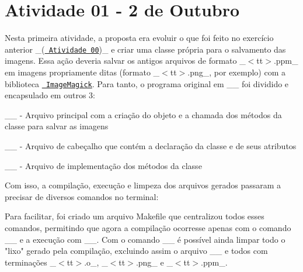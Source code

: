 \chapter{Atividade 01 -\/ 2 de Outubro}
\hypertarget{md__computacao_grafica_2_atividade_0101_01-_0102_810_2_r_e_a_d_m_e}{}\label{md__computacao_grafica_2_atividade_0101_01-_0102_810_2_r_e_a_d_m_e}
\label{md__computacao_grafica_2_atividade_0101_01-_0102_810_2_r_e_a_d_m_e_autotoc_md0}%
%
 Nesta primeira atividade, a proposta era evoluir o que foi feito no exercício anterior \+\_\+(\href{https://github.com/Arth-Felipe/ComputacaoGrafica/tree/main/Atividade\%2000\%20-\%2002.10}{\texttt{ Atividade 00}})\+\_\+ e criar uma classe própria para o salvamento das imagens. Essa ação deveria salvar os antigos arquivos de formato \+\_\+$<$tt$>$.\+ppm\+\_\+ em imagens propriamente ditas (formato \+\_\+$<$tt$>$.\+png\+\_\+, por exemplo) com a biblioteca \href{https://imagemagick.org/index.php}{\texttt{ Image\+Magick}}. Para tanto, o programa original em \+\_\+\_\+ foi dividido e encapsulado em outros 3\+:


\begin{DoxyEnumerate}
\item \+\_\+\_\+ -\/ Arquivo principal com a criação do objeto e a chamada dos métodos da classe para salvar as imagens
\item \+\_\+\_\+ -\/ Arquivo de cabeçalho que contém a declaração da classe e de seus atributos
\item \+\_\+\_\+ -\/ Arquivo de implementação dos métodos da classe
\end{DoxyEnumerate}

Com isso, a compilação, execução e limpeza dos arquivos gerados passaram a precisar de diversos comandos no terminal\+:


\begin{DoxyCode}{0}

\end{DoxyCode}


Para facilitar, foi criado um arquivo Makefile que centralizou todos esses comandos, permitindo que agora a compilação ocorresse apenas com o comando \+\_\+\_\+ e a execução com \+\_\+\_\+. Com o comando \+\_\+\_\+ é possível ainda limpar todo o "{}lixo"{} gerado pela compilação, excluindo assim o arquivo \+\_\+\_\+ e todos com terminações \+\_\+$<$tt$>$.\+o\+\_\+, \+\_\+$<$tt$>$.\+png\+\_\+ e \+\_\+$<$tt$>$.\+ppm\+\_\+.


